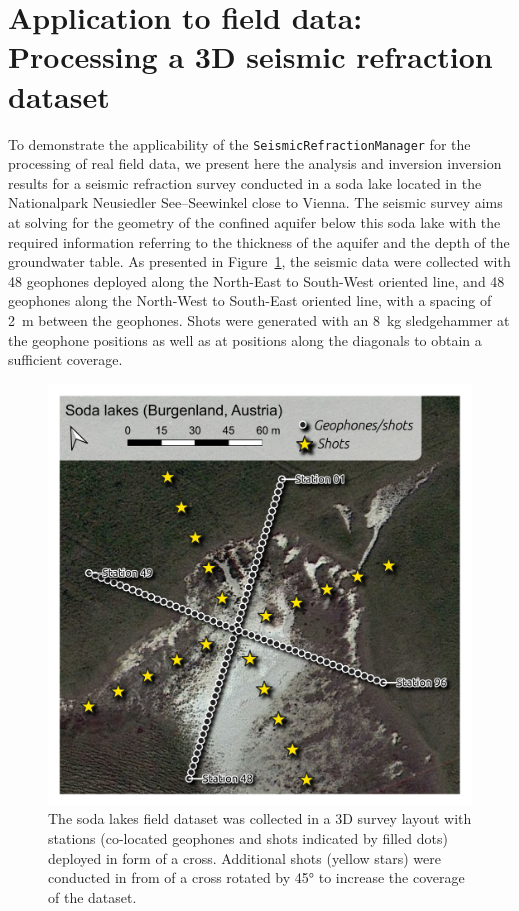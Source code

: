 \documentclass[a4paper,fleqn]{cas-sc}
\begin{document}
\section{Application to field data: Processing a 3D seismic refraction dataset}

To demonstrate the applicability of the  \texttt{SeismicRefractionManager} for the processing of real field data, we present here the analysis and inversion inversion results for a seismic refraction survey conducted in a soda lake located in the Nationalpark Neusiedler See--Seewinkel close to Vienna.
The seismic survey aims at solving for the geometry of the confined aquifer below this soda lake with the required information referring to the thickness of the aquifer and the depth of the groundwater table.
As presented in Figure~\ref{fig:map_sodalakes}, the seismic data were collected with 48 geophones deployed along the North-East to South-West oriented line, and 48 geophones along the North-West to South-East oriented line, with a spacing of \qty{2}{m} between the geophones. Shots were generated with an \qty{8}{kg} sledgehammer at the geophone positions as well as at positions along the diagonals to obtain a sufficient coverage.

\begin{figure}
	\centering
	\includegraphics[width=.75\textwidth]{./figures/map_sodalakes.pdf}
	\caption{The soda lakes field dataset was collected in a 3D survey layout with stations (co-located geophones and shots indicated by filled dots) deployed in form of a cross. Additional shots (yellow stars) were conducted in from of a cross rotated by 45° to increase the coverage of the dataset.}
	\label{fig:map_sodalakes}
\end{figure}
\end{document}
